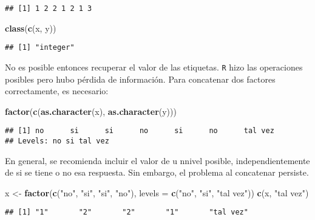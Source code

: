 \documentclass[]{article}
\newenvironment{Shaded}{\begin{snugshade}}{\end{snugshade}}
\newcommand{\KeywordTok}[1]{\textcolor[rgb]{0.13,0.29,0.53}{\textbf{#1}}}
\newcommand{\DataTypeTok}[1]{\textcolor[rgb]{0.13,0.29,0.53}{#1}}
\newcommand{\StringTok}[1]{\textcolor[rgb]{0.31,0.60,0.02}{#1}}
\newcommand{\NormalTok}[1]{#1}
\begin{document}
\begin{verbatim}
## [1] 1 2 2 1 2 1 3
\end{verbatim}

\begin{Shaded}
\begin{Highlighting}[]
\KeywordTok{class}\NormalTok{(}\KeywordTok{c}\NormalTok{(x, y))}
\end{Highlighting}
\end{Shaded}

\begin{verbatim}
## [1] "integer"
\end{verbatim}

No es posible entonces recuperar el valor de las etiquetas. \texttt{R}
hizo las operaciones posibles pero hubo pérdida de información. Para
concatenar dos factores correctamente, es necesario:

\begin{Shaded}
\begin{Highlighting}[]
\KeywordTok{factor}\NormalTok{(}\KeywordTok{c}\NormalTok{(}\KeywordTok{as.character}\NormalTok{(x), }\KeywordTok{as.character}\NormalTok{(y)))}
\end{Highlighting}
\end{Shaded}

\begin{verbatim}
## [1] no      si      si      no      si      no      tal vez
## Levels: no si tal vez
\end{verbatim}

En general, se recomienda incluir el valor de u nnivel posible,
independientemente de si se tiene o no esa respuesta. Sin embargo, el
problema al concatenar persiste.

\begin{Shaded}
\begin{Highlighting}[]
\NormalTok{x <-}\StringTok{ }\KeywordTok{factor}\NormalTok{(}\KeywordTok{c}\NormalTok{(}\StringTok{"no"}\NormalTok{, }\StringTok{"si"}\NormalTok{, }\StringTok{"si"}\NormalTok{, }\StringTok{"no"}\NormalTok{), }\DataTypeTok{levels =} \KeywordTok{c}\NormalTok{(}\StringTok{"no"}\NormalTok{, }\StringTok{"si"}\NormalTok{, }\StringTok{"tal vez"}\NormalTok{))}
\KeywordTok{c}\NormalTok{(x, }\StringTok{"tal vez"}\NormalTok{)}
\end{Highlighting}
\end{Shaded}

\begin{verbatim}
## [1] "1"       "2"       "2"       "1"       "tal vez"
\end{verbatim}
\end{document}

